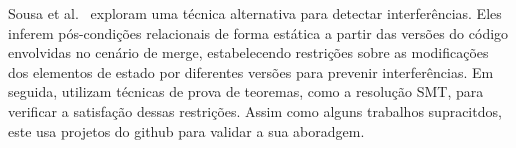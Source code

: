 \documentclass[sigconf,review]{acmart}
\begin{document}
Sousa et al.~\cite{sousa2018verified} exploram uma técnica alternativa para detectar interferências. Eles inferem pós-condições relacionais de forma estática a partir das versões do código envolvidas no cenário de merge, estabelecendo restrições sobre as modificações dos elementos de estado por diferentes versões para prevenir interferências. Em seguida, utilizam técnicas de prova de teoremas, como a resolução SMT, para verificar a satisfação dessas restrições. Assim como alguns trabalhos supracitdos, este usa projetos do github para validar a sua aboradgem.



\end{document}
